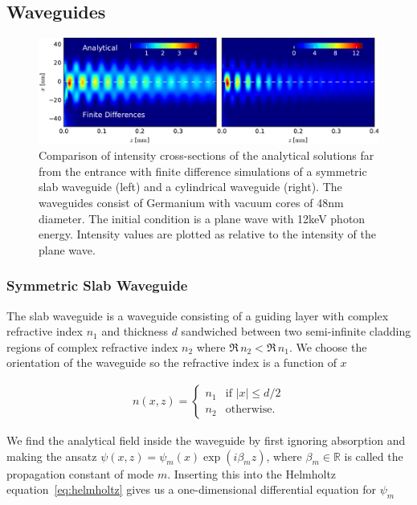 
\subsection{Waveguides}

\begin{figure}[h!]
    \centering
    \includegraphics[width=1\textwidth]{analytical/analytical_waveguide}
    \caption{Comparison of intensity cross-sections of the analytical solutions far from the entrance with finite difference simulations of a symmetric slab waveguide (left) and a cylindrical waveguide (right). The waveguides consist of Germanium with vacuum cores of 48nm diameter. The initial condition is a plane wave with 12keV photon energy. Intensity values are plotted as relative to the intensity of the plane wave.}
    \label{fig:waveguide_fd_analytical_comparison}
\end{figure}


\subsubsection{Symmetric Slab Waveguide}

The slab waveguide is a waveguide consisting of a guiding layer with complex refractive index $n_1$ and thickness $d$ sandwiched between two semi-infinite cladding regions of complex refractive index $n_2$ where $\Re\, n_2 < \Re\, n_1$. We choose the orientation of the waveguide so the refractive index is a function of $x$ 

\begin{align*}
    n(x,z) = 
    \begin{cases}
    n_1 & \text{if } |x| \le d/2\\
    n_2 & \text{otherwise.}
    \end{cases}
\end{align*}

We find the analytical field inside the waveguide by first ignoring absorption and making the ansatz $\psi(x,z) = \psi_m(x) \exp(i \beta_m z)$, where $\beta_m \in \mathbb{R}$ is called the propagation constant of mode $m$. Inserting this into the Helmholtz equation~\eqref{eq:helmholtz} gives us a one-dimensional differential equation for $\psi_m$

